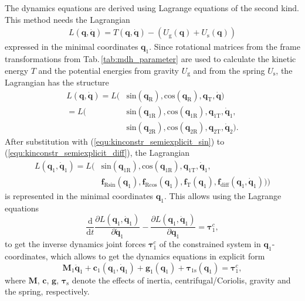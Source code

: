 \documentclass[letterpaper, 10 pt, conference]{ieeeconf}  %
\begin{document}
The dynamics equations are derived using Lagrange equations of the second kind. This method needs the Lagrangian 
%
\begin{align}
L(\bm{q},\dot{\bm{q}}) = T(\bm{q},\dot{\bm{q}})-(U_\mathrm{g}(\bm{q})+U_\mathrm{s}(\bm{q}))
\label{equ:Lagrange_energy}
\end{align}
%
expressed in the minimal coordinates $\bm{q}_1$. Since rotational matrices from the frame transformations from Tab.\,\ref{tab:mdh_parameter} are used to calculate the kinetic energy $T$ and the potential energies from gravity $U_\mathrm{g}$ and from the spring $U_\mathrm{s}$, the Lagrangian has the structure
%
\begin{align}
L(\bm{q},\dot{\bm{q}}) =L( & \mathrm{sin}  (\bm{q}_{\mathrm{R}}),\mathrm{cos}(\bm{q}_{\mathrm{R}}), \bm{q}_{\mathrm{T}},\dot{\bm{q}}) \\
=L( & \mathrm{sin}  (\bm{q}_{1\mathrm{R}}),\mathrm{cos}(\bm{q}_{1\mathrm{R}}), \bm{q}_{1\mathrm{T}},\dot{\bm{q}}_{1}, \nonumber \\
& \mathrm{sin}  (\bm{q}_{2\mathrm{R}}),\mathrm{cos}(\bm{q}_{2\mathrm{R}}), \bm{q}_{2\mathrm{T}},\dot{\bm{q}}_{2}).
\end{align}
%
After substitution with (\ref{equ:kinconstr_semiexplicit_sin}) to (\ref{equ:kinconstr_semiexplicit_diff}), the Lagrangian 
%
\begin{align}
L(\bm{q}_1,\dot{\bm{q}}_1)=L( & \mathrm{sin} (\bm{q}_{1\mathrm{R}}),\mathrm{cos}(\bm{q}_{1\mathrm{R}}), \bm{q}_{1\mathrm{T}},\dot{\bm{q}}_{1}, \\
 & \bm{f}_{\mathrm{R}\mathrm{sin}}(\bm{q}_1),
\bm{f}_{\mathrm{R}\mathrm{cos}}(\bm{q}_1),
\bm{f}_{\mathrm{T}}(\bm{q}_1),
\bm{f}_\mathrm{diff}(\bm{q}_1,\dot{\bm{q}}_1))) \nonumber
\end{align}
%
is represented in the minimal coordinates $\bm{q}_1$.
This allows using the Lagrange equations
%
\begin{equation}
\frac{\mathrm{d}}{\mathrm{d}t}\frac{\partial L(\bm{q}_1,\dot{\bm{q}}_1)}{\partial \dot{\bm{q}}_1} - \frac{\partial L(\bm{q}_1,\dot{\bm{q}}_1)}{\partial \bm{q}_1}= \bm{\tau}^c_1,
\end{equation}
%
to get the inverse dynamics joint forces $\bm{\tau}^c_1$ of the constrained system in $\bm{q}_1$-coordinates, which allows to get the dynamics equations in explicit form
%
\begin{equation}
\bm{M}_1\ddot{\bm{q}}_1+\bm{c}_1(\bm{q}_1,\dot{\bm{q}}_1)+\bm{g}_1(\bm{q}_1) + \bm{\tau}_{1\mathrm{s}}(\bm{q}_1) = \bm{\tau}^c_1,
\label{equ:Dyn_MinKoord}
\end{equation}
%
where $\bm{M}$, $\bm{c}$, $\bm{g}$, $\bm{\tau}_{\mathrm{s}}$ denote the effects of inertia, centrifugal/Coriolis, gravity and the spring, respectively.
\end{document}
